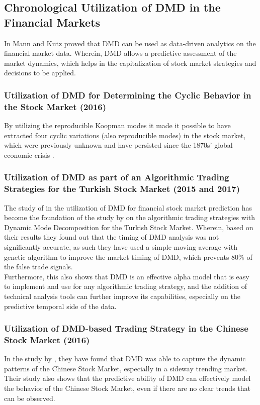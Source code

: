 \subsection{Chronological Utilization of DMD in the Financial Markets}
\label{subsec:chronological_utilization_dmd}
In \citeyear{Mann2015} Mann and Kutz proved that DMD can be used as data-driven analytics 
on the financial market data. Wherein, DMD allows a predictive assessment of 
the market dynamics, which helps in the capitalization of stock market 
strategies and decisions to be applied.

\subsubsection{Utilization of DMD for Determining the Cyclic Behavior in the Stock Market (2016)}
\label{subsubsec:dmd_cyclic_behavior}
By utilizing the reproducible Koopman modes it made it possible to have extracted 
four cyclic variations (also reproducible modes) in the stock market, which 
were previously unknown and have persisted since the 1870s’ 
global economic crisis
\cite{Hua2016,Williamson2015}.
\subsubsection{Utilization of DMD as part of an Algorithmic Trading Strategies for the Turkish Stock Market (2015 and 2017)}
\label{subsubsec:dmd_algorithmic_trading}
The study of  in the utilization of DMD for financial stock market 
prediction has become the foundation of the study by  
on the algorithmic trading strategies with Dynamic Mode Decomposition 
for the Turkish Stock Market. Wherein, based on their results they found out 
that the timing of DMD analysis was not significantly accurate, as such they 
have used a simple moving average with genetic algorithm to improve the market 
timing of DMD, which prevents 80\% of the false trade signals.
\vspace{0.5cm}
\\Furthermore, this also shows that DMD is an effective alpha 
model that is easy to implement and use for any algorithmic trading 
strategy, and the addition of technical analysis tools can further improve 
its capabilities, especially on the predictive temporal side of the data.
\subsubsection{Utilization of DMD-based Trading Strategy in the Chinese Stock Market (2016)}
\label{subsubsec:dmd_chinese_stock_market}
In the study by , they have found that DMD was able to capture the 
dynamic patterns of the Chinese Stock Market, especially in a sideway trending market.
\vspace{0.5cm}
\\Their study also shows that the predictive ability of DMD can effectively 
model the behavior of the Chinese Stock Market, even if there are no 
clear trends that can be observed.
